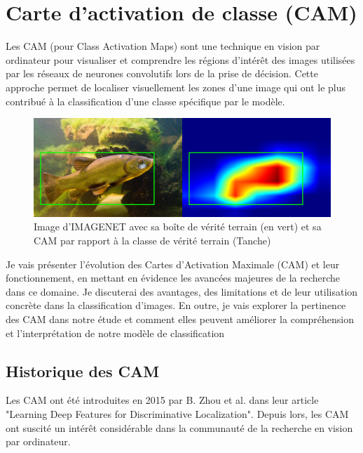 \documentclass{report}
\begin{document}
{\section{Carte d'activation de classe (CAM)}
\hspace{1.6cm}Les CAM (pour Class Activation Maps) sont une technique en vision par ordinateur pour visualiser et comprendre les régions d'intérêt des images utilisées par les réseaux de neurones convolutifs lors de la prise de décision. Cette approche permet de localiser visuellement les zones d'une image qui ont le plus contribué à la classification d'une classe spécifique par le modèle.
\vspace*{0.5\baselineskip}
\begin{figure}[htbp] 
	\centering
        \includegraphics[width=16cm]{logo/CAM.png} 
	\caption{Image d'IMAGENET avec sa boîte de vérité terrain (en vert) et sa CAM par rapport à la classe de vérité terrain (Tanche)}
	\label{fig:Exemples d'image provenants d'IMAGENET avec leurs boîtes de vérité terrain}
\end{figure}

\hspace{1.6cm}Je vais présenter l'évolution des Cartes d'Activation Maximale (CAM) et leur fonctionnement, en mettant en évidence les avancées majeures de la recherche dans ce domaine. Je discuterai des avantages, des limitations et de leur utilisation concrète dans la classification d'images. En outre, je vais explorer la pertinence des CAM dans notre étude et comment elles peuvent améliorer la compréhension et l'interprétation de notre modèle de classification


\subsection{Historique des CAM}

\hspace{1.6cm}Les CAM ont été introduites en 2015 par B. Zhou et al. dans leur article "Learning Deep Features for Discriminative Localization"\cite{Zhou_2016_CVPR}. Depuis lors, les CAM ont suscité un intérêt considérable dans la communauté de la recherche en vision par ordinateur.

}
\end{document}
